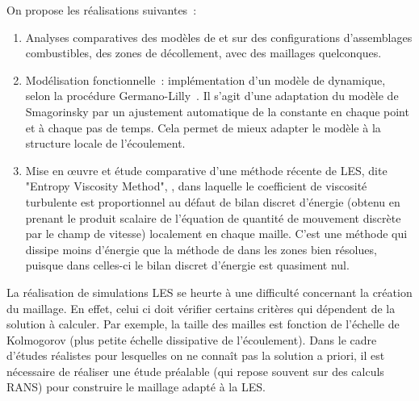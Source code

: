 On propose les r\'ealisations suivantes~:
\begin{enumerate}
\item
Analyses comparatives des mod\`eles de {} et {} sur des configurations d'assemblages combustibles, des zones de d\'ecollement, avec des maillages quelconques.
\item
Mod\'elisation fonctionnelle~: impl\'ementation d'un mod\`ele de {} dynamique, selon la proc\'edure Germano-Lilly~\cite{Germano}. Il s'agit d'une adaptation du mod\`ele de Smagorinsky par un ajustement automatique de la constante en chaque point et \`a chaque pas de temps. Cela permet de mieux adapter le mod\`ele \`a la structure locale de l'\'ecoulement.
\item Mise en {\oe}uvre et \'etude comparative d'une m\'ethode r\'ecente de LES, dite "Entropy Viscosity Method", \cite{Guermond1,Guermondverif,Wang}, dans laquelle le coefficient de viscosit\'e turbulente est proportionnel au d\'efaut de bilan discret d'\'energie (obtenu en prenant le produit scalaire de l'\'equation de quantit\'e de mouvement discr\`ete par le champ de vitesse) localement en chaque maille.  C'est une m\'ethode qui dissipe moins d'\'energie que la m\'ethode de {} dans les zones bien r\'esolues, puisque dans celles-ci le bilan discret d'\'energie est quasiment nul.
\end{enumerate}
La r\'ealisation de simulations LES se heurte \`a une difficult\'e concernant la cr\'eation du maillage. En effet, celui ci doit v\'erifier certains crit\`eres qui
d\'ependent de la solution \`a calculer. Par exemple, la taille des mailles est fonction de l'\'echelle de Kolmogorov (plus petite \'echelle dissipative de l'\'ecoulement).
Dans le cadre d'\'etudes r\'ealistes pour lesquelles on ne conna\^it pas la solution a priori, il est n\'ecessaire de r\'ealiser une \'etude pr\'ealable (qui repose souvent sur des calculs RANS) pour construire le maillage adapt\'e \`a la LES.


